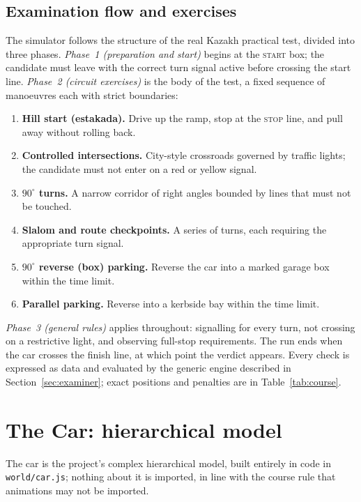 \documentclass[11pt]{article}
\newcommand{\code}[1]{\texttt{#1}}
\begin{document}
\subsection{Examination flow and exercises}

The simulator follows the structure of the real Kazakh practical test, divided
into three phases. \emph{Phase~1 (preparation and start)} begins at the
\textsc{start} box; the candidate must leave with the correct turn signal active
before crossing the start line. \emph{Phase~2 (circuit exercises)} is the body of
the test, a fixed sequence of manoeuvres each with strict boundaries:

\begin{enumerate}
  \item \textbf{Hill start (estakada).} Drive up the ramp, stop at the
    \textsc{stop} line, and pull away without rolling back.
  \item \textbf{Controlled intersections.} City-style crossroads governed by
    traffic lights; the candidate must not enter on a red or yellow signal.
  \item \textbf{$90^\circ$ turns.} A narrow corridor of right angles bounded by
    lines that must not be touched.
  \item \textbf{Slalom and route checkpoints.} A series of turns, each requiring
    the appropriate turn signal.
  \item \textbf{$90^\circ$ reverse (box) parking.} Reverse the car into a marked
    garage box within the time limit.
  \item \textbf{Parallel parking.} Reverse into a kerbside bay within the time
    limit.
\end{enumerate}

\emph{Phase~3 (general rules)} applies throughout: signalling for every turn, not
crossing on a restrictive light, and observing full-stop requirements. The run
ends when the car crosses the finish line, at which point the verdict appears.
Every check is expressed as data and evaluated by the generic engine described in
Section~\ref{sec:examiner}; exact positions and penalties are in
Table~\ref{tab:course}.

\section{The Car: hierarchical model}

The car is the project's complex hierarchical model, built entirely in code in
\code{world/car.js}; nothing about it is imported, in line with the course rule
that animations may not be imported.
\end{document}
